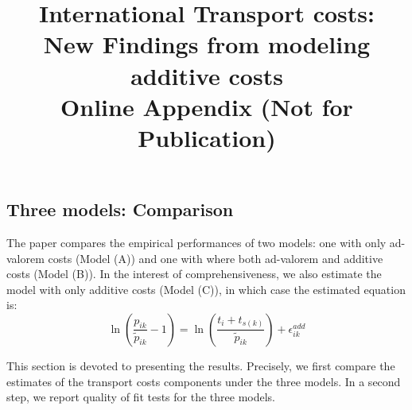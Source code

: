 \documentclass[11pt,twoside, authoryear]{elsarticle}
\begin{document}
\title{\textbf{International Transport costs:\\New Findings from modeling additive costs}\\Online Appendix (Not for Publication)}





\maketitle






\tableofcontents
\vspace{1cm}
\newpage
\listoftables

\newpage



%
%
%
%
%			
%			
%				
%
%

	\renewcommand\thesubsubsection{\Alph{subsection}.\arabic{subsubsection}}
	
	\renewcommand\thesubsection{\Alph{subsection}}
	
	
\subsection{Three models: Comparison \label{secoa:additive_only}}

The paper compares the empirical performances of two models: one with only ad-valorem costs (Model (A)) and one with where both ad-valorem and additive costs (Model (B)).
In the interest of comprehensiveness,  we also estimate the model with only additive costs (Model (C)), in which case the estimated equation is:
$$\ln\left(\frac{p_{ik}}{\widetilde{p}_{ik}}-1 \right)= \ln \left(\frac{t_{i} + t_{s(k)}}{\widetilde{p}_{ik}}\right) + \epsilon^{add}_{ik}$$

This section is devoted to presenting the results. Precisely, we first compare the estimates of the transport costs components under the three models. In a second step, we report quality of fit tests for the three models.
\end{document}
